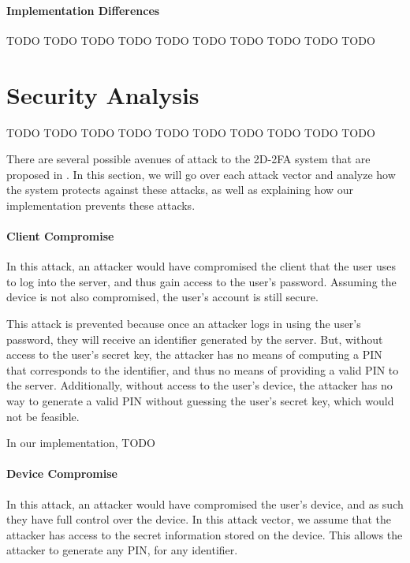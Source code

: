 \documentclass[11pt]{article} %
\begin{document}
\paragraph{Implementation Differences}

TODO TODO TODO TODO TODO TODO TODO TODO TODO TODO


\section{Security Analysis}

TODO TODO TODO TODO TODO TODO TODO TODO TODO TODO

There are several possible avenues of attack to the 2D-2FA system that
are proposed in \cite{shirvanian2d2fa}. In this section, we will go over
each attack vector and analyze how the system protects against these
attacks, as well as explaining how our implementation prevents these
attacks. 

\paragraph{Client Compromise}
In this attack, an attacker would have compromised the client that the
user uses to log into the server, and thus gain access to the user's
password. Assuming the device is not also compromised, the user's
account is still secure. 

This attack is prevented because once an attacker logs in using the
user's password, they will receive an identifier generated by the
server. But, without access to the user's secret key, the attacker has
no means of computing a PIN that corresponds to the identifier, and
thus no means of providing a valid PIN to the server. Additionally,
without access to the user's device, the attacker has no way to generate
a valid PIN without guessing the user's secret key, which would not be
feasible. 

In our implementation, TODO

\paragraph{Device Compromise}
In this attack, an attacker would have compromised the user's device,
and as such they have full control over the device. In this attack
vector, we assume that the attacker has access to the secret information
stored on the device. This allows the attacker to generate any PIN, for
any identifier.
\end{document}

